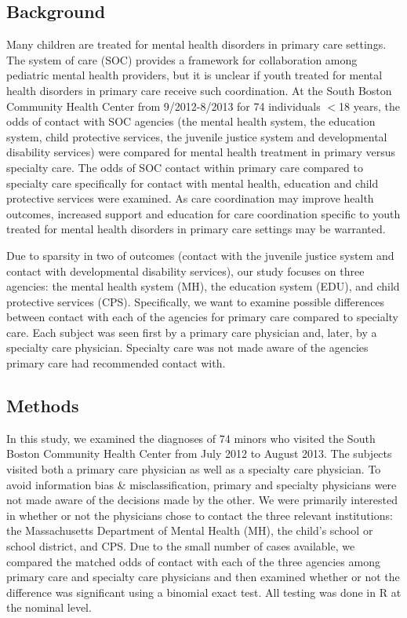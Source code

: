 \documentclass{article}
\begin{document}
	\subsection*{Background}
	Many children are treated for mental health disorders in primary care settings.  The system of care (SOC) provides a framework for collaboration among pediatric mental health providers, but it is unclear if youth treated for mental health disorders in primary care receive such coordination.  At the South Boston Community Health Center from 9/2012-8/2013 for 74 individuals $<$18 years, the odds of contact with SOC agencies (the mental health system, the education system, child protective services, the juvenile justice system and developmental disability services) were compared for mental health treatment in primary versus specialty care.  The odds of SOC contact within primary care compared to specialty care specifically for contact with mental health, education and child protective services were examined.  As care coordination may improve health outcomes, increased support and education for care coordination specific to youth treated for mental health disorders in primary care settings may be warranted.
	
	Due to sparsity in two of outcomes (contact with the juvenile justice system and contact with developmental disability services), our study focuses on three agencies: the mental health system (MH), the education system (EDU), and child protective services (CPS). Specifically, we want to examine possible differences between contact with each of the agencies for primary care compared to specialty care. Each subject was seen first by a primary care physician and, later, by a specialty care physician. Specialty care was not made aware of the agencies primary care had recommended contact with. 

	\subsection*{Methods}
	In this study, we examined the diagnoses of 74 minors who visited the South Boston Community Health Center from July 2012 to August 2013. The subjects visited both a primary care physician as well as a specialty care physician. To avoid information bias \& misclassification, primary and specialty physicians were not made aware of the decisions made by the other. We were primarily interested in whether or not the physicians chose to contact the three relevant institutions: the Massachusetts Department of Mental Health (MH), the child’s school or school district, and CPS. Due to the small number of cases available, we compared the matched odds of contact with each of the three agencies among primary care and specialty care physicians and then examined whether or not the difference was significant using a binomial exact test. All testing was done in R at the nominal level.
\end{document}
